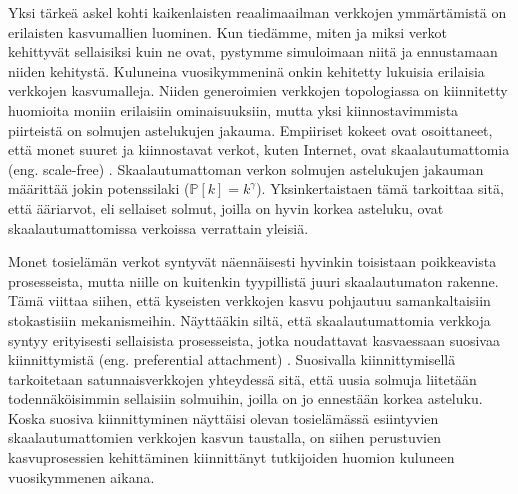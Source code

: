 \documentclass[finnish, 12pt, a4paper, sci, utf8, pdfa]{aaltothesis}
\newcommand*{\prob}{\mathbb{P}}
\begin{document}
Yksi tärkeä askel kohti kaikenlaisten reaalimaailman verkkojen ymmärtämistä on erilaisten kasvumallien luominen. Kun tiedämme, miten ja miksi verkot kehittyvät sellaisiksi kuin ne ovat,
pystymme simuloimaan niitä ja ennustamaan niiden kehitystä. Kuluneina vuosikymmeninä onkin kehitetty lukuisia erilaisia verkkojen kasvumalleja. Niiden generoimien verkkojen
topologiassa on kiinnitetty huomioita moniin erilaisiin ominaisuuksiin, mutta yksi kiinnostavimmista piirteistä on solmujen astelukujen jakauma. Empiiriset kokeet ovat osoittaneet, 
että monet suuret ja kiinnostavat verkot, kuten Internet, ovat skaalautumattomia (eng. scale-free) \cite{Clauset}. Skaalautumattoman verkon solmujen astelukujen jakauman määrittää jokin 
potenssilaki ($ \prob \left[ k \right] = k^{\gamma} $). Yksinkertaistaen tämä tarkoittaa sitä, että ääriarvot, eli sellaiset solmut, joilla on hyvin korkea asteluku, ovat 
skaalautumattomissa verkoissa verrattain yleisiä. \cite{Babarasi-kirja} 

Monet tosielämän verkot syntyvät näennäisesti hyvinkin toisistaan poikkeavista prosesseista, mutta niille on kuitenkin tyypillistä juuri skaalautumaton rakenne. Tämä viittaa siihen,
että kyseisten verkkojen kasvu pohjautuu samankaltaisiin stokastisiin mekanismeihin. Näyttääkin siltä, että skaalautumattomia verkkoja syntyy erityisesti sellaisista prosesseista, 
jotka noudattavat kasvaessaan suosivaa kiinnittymistä (eng. preferential attachment) \cite{Babarasi}. Suosivalla kiinnittymisellä tarkoitetaan satunnaisverkkojen yhteydessä sitä, että uusia 
solmuja liitetään todennäköisimmin sellaisiin solmuihin, joilla on jo ennestään korkea asteluku. Koska suosiva kiinnittyminen näyttäisi olevan tosielämässä esiintyvien skaalautumattomien
verkkojen kasvun taustalla, on siihen perustuvien kasvuprosessien kehittäminen kiinnittänyt tutkijoiden huomion kuluneen vuosikymmenen aikana. 
\end{document}
